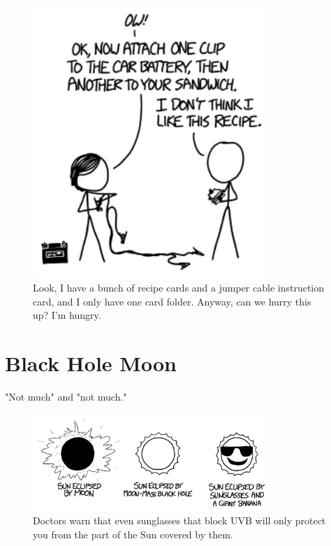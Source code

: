 {\begin{figure}[!htbp]
\centering
\includegraphics[scale=0.5, max width=0.8\textwidth]{imgs/a/128/jump.png}
\caption{Look, I have a bunch of recipe cards and a jumper cable instruction card, and I only have one card folder. Anyway, can we hurry this up? I'm hungry.}
\end{figure}

{
\chapter{Black Hole Moon}
}

\hfill{}

{"Not much" and "not much."}

\begin{figure}[!htbp]
\centering
\includegraphics[scale=0.5, max width=0.8\textwidth]{imgs/a/129/eclipse.png}
\caption{Doctors warn that even sunglasses that block UVB will only protect you from the part of the Sun covered by them.}
\end{figure}

}
